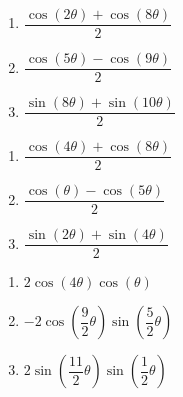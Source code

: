 \begin{multicols}{3}

\begin{enumerate}

\setcounter{enumi}{\value{HW}}

\addtocounter{enumi}{15}

\item $\dfrac{\cos(2\theta) + \cos(8\theta)}{2}$
\item $\dfrac{\cos(5\theta) - \cos(9\theta)}{2}$
\item $\dfrac{\sin(8\theta) + \sin(10\theta)}{2}$

\setcounter{HW}{\value{enumi}}

\end{enumerate}

\end{multicols}

\begin{multicols}{3}

\begin{enumerate}

\setcounter{enumi}{\value{HW}}

\item $\dfrac{\cos(4\theta) + \cos(8\theta)}{2}$
\item  $\dfrac{\cos(\theta) - \cos(5\theta)}{2}$
\item  $\dfrac{\sin(2\theta) + \sin(4\theta)}{2}$

\setcounter{HW}{\value{enumi}}

\end{enumerate}

\end{multicols}

\begin{multicols}{3}

\begin{enumerate}

\setcounter{enumi}{\value{HW}}

\item $2\cos(4\theta)\cos(\theta)$
\item $-2\cos \left( \dfrac{9}{2}\theta \right) \sin \left( \dfrac{5}{2}\theta \right)$
\item $2\sin \left( \dfrac{11}{2}\theta \right) \sin \left( \dfrac{1}{2}\theta \right)$

\setcounter{HW}{\value{enumi}}

\end{enumerate}

\end{multicols}

